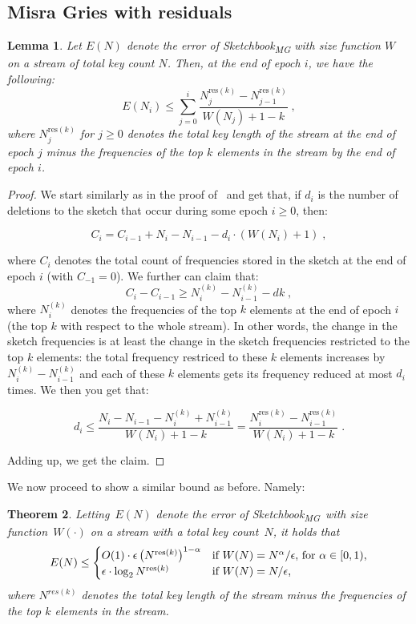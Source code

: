 \documentclass[sigconf]{acmart}
\newtheorem{theorem}{Theorem}[section]
\newtheorem{lemma}[theorem]{Lemma}
\newcommand{\sketch}{Sketchbook}
\newcommand{\sketchmg}{\sketch\textsubscript{MG}\xspace}
\begin{document}
\subsection{Misra Gries with residuals}





\begin{lemma}\label{lemma:mg-res-w}
Let $E(N)$  denote the error of \sketchmg with size function $W$ on a stream of total key count $N$. Then, at the end of epoch $i$, we have the following:
$$E(N_i)\leq \sum_{j=0}^i  \frac{N^{\text{res}(k)}_j- N^{\text{res}(k)}_{j-1}}{W(N_j)+1-k}   \;,$$
where $N^{\text{res}(k)}_j$ for $j\geq 0$ denotes the total key length of the stream at the end of epoch $j$ minus the frequencies of the top $k$ elements in the stream by the end of epoch $i$.
\end{lemma}
\begin{proof}
We start similarly as in the proof of~ and get that, if $d_i$ is the number of deletions to the sketch that occur during some epoch $i \geq 0$, then:

$$ C_i = C_{i-1} + N_i - N_{i-1} - d_i \cdot (W(N_i)+1) \;,$$

where $C_i$ denotes the total count of frequencies stored in the sketch at the end of epoch $i$ (with $C_{-1}=0$). 
We further can claim that:
$$ C_i - C_{i-1} \geq  N^{(k)}_i - N^{(k)}_{i-1} - dk \;,$$
where $N^{(k)}_i $ denotes the frequencies of the top $k$ elements at the end of epoch $i$ (the top $k$ with respect to the whole stream).
In other words, the change in the sketch frequencies is at least the change in the sketch frequencies restricted to the top $k$ elements: the total frequency restriced to these $k$ elements increases by $N^{(k)}_i - N^{(k)}_{i-1}$ and each of these $k$ elements gets its frequency reduced at most $d_i$ times. We then you get that:

$$d_i \leq  \frac{N_i - N_{i-1} -N^{(k)}_i + N^{(k)}_{i-1}}{W(N_i)+1-k} =  \frac{N^{\text{res}(k)}_i- N^{\text{res}(k)}_{i-1}}{W(N_i)+1-k}  \;.$$

Adding up, we get the claim.

\end{proof}


We now proceed to show a similar bound as before. Namely:

\begin{theorem}
\label{thm:mg-res}
Letting~$E(N)$ denote the error of \sketchmg\ with size function~$W(\cdot)$ on a stream with a total key count~$N$, it holds that
$$
E(N) \leq  
\begin{cases}
	O(1) \cdot   \epsilon \left(N^{\text{res}(k)}\right)^{1-\alpha} & \text{if $W(N)=N^{\alpha}/\epsilon$, for $\alpha \in [0,1)$,} \\
 \epsilon \cdot \log_2 N^{\text{res}(k)}  & \text{if $W(N)=N/\epsilon$,}
\end{cases}
$$
where $N^{res(k)}$ denotes the total key length of the stream minus the frequencies of the top $k$ elements in the stream.
\end{theorem}
\end{document}
